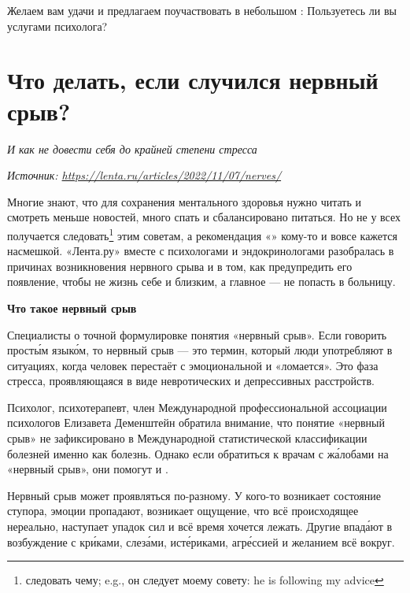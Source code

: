 Желаем вам удачи и предлагаем поучаствовать в небольшом : Пользуетесь ли вы услугами психолога?

\newpage
\section{Что делать, если случился нервный срыв?}

\textit{И как не довести себя до крайней степени стресса}

\textit{Источник: \url{https://lenta.ru/articles/2022/11/07/nerves/}}

Многие знают, что для сохранения ментального здоровья нужно читать и смотреть меньше новостей, много спать и сбалансировано питаться. Но не у всех получается следовать\footnote{следовать чему; e.g., он следует моему совету: he is following my advice} этим советам, а рекомендация «» кому-то и вовсе кажется насмешкой. «Лента.ру» вместе с психологами и эндокринологами разобралась в причинах возникновения нервного срыва и в том, как предупредить его появление, чтобы не  жизнь себе и близким, а главное --- не попасть в больницу.

\textbf{Что такое нервный срыв}

Специалисты  о точной формулировке понятия «нервный срыв». Если говорить прост\'{ы}м язык\'{о}м, то нервный срыв  ---  это термин, который люди употребляют в ситуациях, когда человек перестаёт  с эмоциональной  и «ломается». Это  фаза стресса, проявляющаяся в виде невротических и депрессивных расстройств.

Психолог, психотерапевт, член Международной профессиональной ассоциации психологов Елизавета Деменштейн обратила внимание, что понятие «нервный срыв» не зафиксировано в Международной статистической классификации болезней именно как болезнь. Однако если обратиться к врачам с ж\'{а}лобами на «нервный срыв», они помогут и .

Нервный срыв может проявляться по-разному. У кого-то возникает состояние ступора, эмоции пропадают, возникает ощущение, что всё происходящее нереально, наступает упадок сил и всё время хочется лежать. Другие впад\'{а}ют в возбуждение с кр\'{и}ками, слез\'{а}ми, ист\'{е}риками, агр\'{е}ссией и желанием  всё вокруг.

